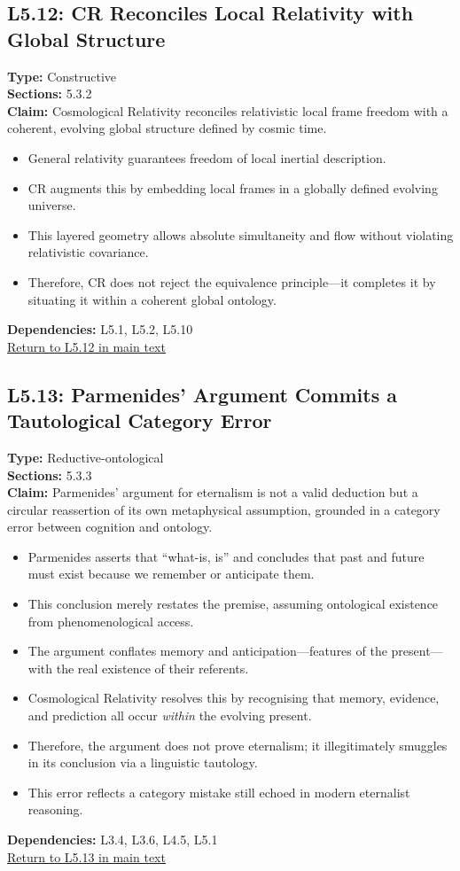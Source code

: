 \documentclass[12pt]{book}
\newcommand{\returnlink}[1]{\hyperref[logic:#1]{Return to #1 in main text}\xspace}
\begin{document}
\subsection*{L5.12: CR Reconciles Local Relativity with Global Structure}
\label{appendix:L5.12}
\textbf{Type:} Constructive \\
\textbf{Sections:} 5.3.2 \\
\textbf{Claim:} Cosmological Relativity reconciles relativistic local frame freedom with a coherent, evolving global structure defined by cosmic time.
\begin{itemize}
  \item General relativity guarantees freedom of local inertial description.
  \item CR augments this by embedding local frames in a globally defined evolving universe.
  \item This layered geometry allows absolute simultaneity and flow without violating relativistic covariance.
  \item Therefore, CR does not reject the equivalence principle---it completes it by situating it within a coherent global ontology.
\end{itemize}
\textbf{Dependencies:} L5.1, L5.2, L5.10 \\
\returnlink{L5.12}

\subsection*{L5.13: Parmenides' Argument Commits a Tautological Category Error}
\label{appendix:L5.13}
\textbf{Type:} Reductive-ontological \\
\textbf{Sections:} 5.3.3 \\
\textbf{Claim:} Parmenides' argument for eternalism is not a valid deduction but a circular reassertion of its own metaphysical assumption, grounded in a category error between cognition and ontology.
\begin{itemize}
  \item Parmenides asserts that ``what-is, is'' and concludes that past and future must exist because we remember or anticipate them.
  \item This conclusion merely restates the premise, assuming ontological existence from phenomenological access.
  \item The argument conflates memory and anticipation---features of the present---with the real existence of their referents.
  \item Cosmological Relativity resolves this by recognising that memory, evidence, and prediction all occur \textit{within} the evolving present.
  \item Therefore, the argument does not prove eternalism; it illegitimately smuggles in its conclusion via a linguistic tautology.
  \item This error reflects a category mistake still echoed in modern eternalist reasoning.
\end{itemize}
\textbf{Dependencies:} L3.4, L3.6, L4.5, L5.1 \\
\returnlink{L5.13}
\end{document}
